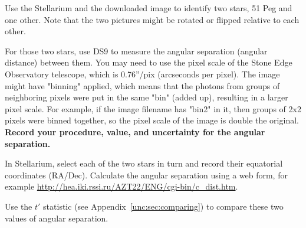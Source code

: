 \begin{steps}
	\item Use the Stellarium and the downloaded image to identify two stars, 51 Peg and one other. Note that the two pictures might be rotated or flipped relative to each other.

	\item For those two stars, use DS9 to measure the angular separation (angular distance) between them. You may need to use the pixel scale of the Stone Edge Observatory telescope, which is 0.76''/pix (arcseconds per pixel). The image might have "binning" applied, which means that the photons from groups of neighboring pixels were put in the same "bin" (added up), resulting in a larger pixel scale. For example, if the image filename has "bin2" in it, then groups of 2x2 pixels were binned together, so the pixel scale of the image is double the original. \textbf{Record your procedure, value, and uncertainty for the angular separation.}

	\item In Stellarium, select each of the two stars in turn and record their equatorial coordinates (RA/Dec). Calculate the angular separation using a web form, for example \url{http://hea.iki.rssi.ru/AZT22/ENG/cgi-bin/c_dist.htm}.

	\item Use the $t'$ statistic (see Appendix\ \ref{unc:sec:comparing}) to compare these two values of angular separation.


\end{steps}



